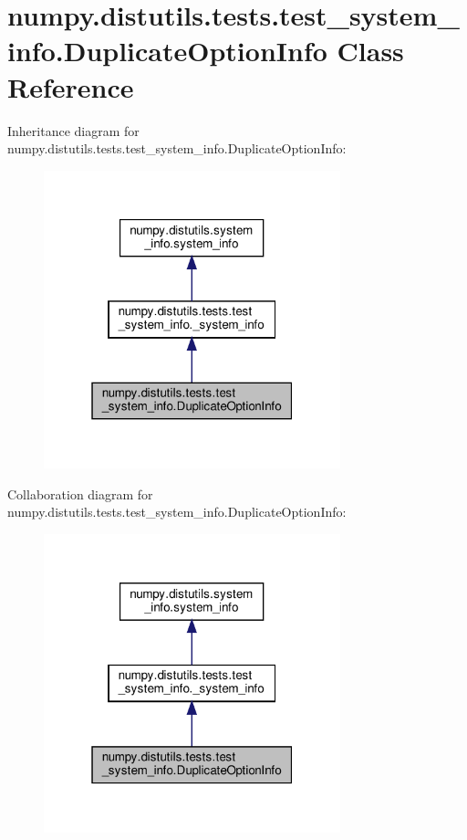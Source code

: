\hypertarget{classnumpy_1_1distutils_1_1tests_1_1test__system__info_1_1DuplicateOptionInfo}{}\section{numpy.\+distutils.\+tests.\+test\+\_\+system\+\_\+info.\+Duplicate\+Option\+Info Class Reference}
\label{classnumpy_1_1distutils_1_1tests_1_1test__system__info_1_1DuplicateOptionInfo}


Inheritance diagram for numpy.\+distutils.\+tests.\+test\+\_\+system\+\_\+info.\+Duplicate\+Option\+Info\+:
\nopagebreak
\begin{figure}[H]
\begin{center}
\leavevmode
\includegraphics[width=244pt]{classnumpy_1_1distutils_1_1tests_1_1test__system__info_1_1DuplicateOptionInfo__inherit__graph}
\end{center}
\end{figure}


Collaboration diagram for numpy.\+distutils.\+tests.\+test\+\_\+system\+\_\+info.\+Duplicate\+Option\+Info\+:
\nopagebreak
\begin{figure}[H]
\begin{center}
\leavevmode
\includegraphics[width=244pt]{classnumpy_1_1distutils_1_1tests_1_1test__system__info_1_1DuplicateOptionInfo__coll__graph}
\end{center}
\end{figure}
